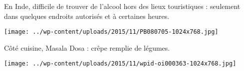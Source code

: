   En Inde, difficile de trouver de l'alcool hors des lieux touristiques : seulement dans quelques endroits autorisés et à certaines heures. 
  \vfill
\begin{center} \texttt{[image: ../wp-content/uploads/2015/11/PB080705-1024x768.jpg]} \end{center}

\vfill
  Côté cuisine, Masala Dosa : crêpe remplie de légumes.
  \vfill
\begin{center} \texttt{[image: ../wp-content/uploads/2015/11/wpid-oi000363-1024x768.jpg]} \end{center}
\vspace{-\topsep}
\vspace{-0.75mm}
